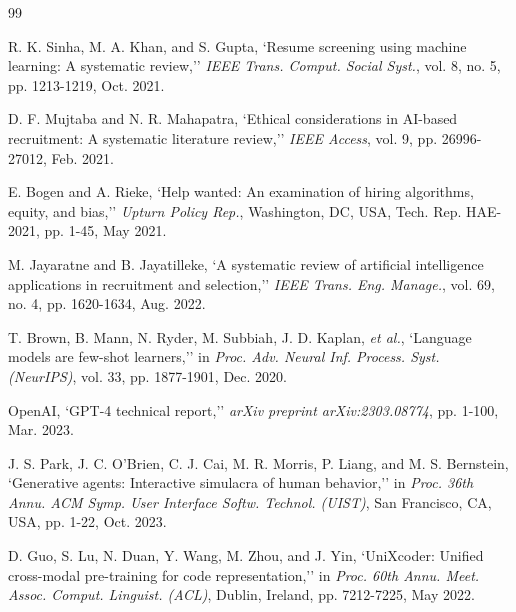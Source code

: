 \documentclass[12pt,a4paper]{report}
\begin{document}
\cleardoublepage
{}







\renewcommand{\bibname}{References and Bibliography}
\begin{thebibliography}{99}


R. K. Sinha, M. A. Khan, and S. Gupta, `Resume screening using machine learning: A systematic review,'' \textit{IEEE Trans. Comput. Social Syst.}, vol. 8, no. 5, pp. 1213-1219, Oct. 2021.

D. F. Mujtaba and N. R. Mahapatra, `Ethical considerations in AI-based recruitment: A systematic literature review,'' \textit{IEEE Access}, vol. 9, pp. 26996-27012, Feb. 2021.

E. Bogen and A. Rieke, `Help wanted: An examination of hiring algorithms, equity, and bias,'' \textit{Upturn Policy Rep.}, Washington, DC, USA, Tech. Rep. HAE-2021, pp. 1-45, May 2021.

M. Jayaratne and B. Jayatilleke, `A systematic review of artificial intelligence applications in recruitment and selection,'' \textit{IEEE Trans. Eng. Manage.}, vol. 69, no. 4, pp. 1620-1634, Aug. 2022.

T. Brown, B. Mann, N. Ryder, M. Subbiah, J. D. Kaplan, \textit{et al.}, `Language models are few-shot learners,'' in \textit{Proc. Adv. Neural Inf. Process. Syst. (NeurIPS)}, vol. 33, pp. 1877-1901, Dec. 2020.

OpenAI, `GPT-4 technical report,'' \textit{arXiv preprint arXiv:2303.08774}, pp. 1-100, Mar. 2023.

J. S. Park, J. C. O'Brien, C. J. Cai, M. R. Morris, P. Liang, and M. S. Bernstein, `Generative agents: Interactive simulacra of human behavior,'' in \textit{Proc. 36th Annu. ACM Symp. User Interface Softw. Technol. (UIST)}, San Francisco, CA, USA, pp. 1-22, Oct. 2023.

D. Guo, S. Lu, N. Duan, Y. Wang, M. Zhou, and J. Yin, `UniXcoder: Unified cross-modal pre-training for code representation,'' in \textit{Proc. 60th Annu. Meet. Assoc. Comput. Linguist. (ACL)}, Dublin, Ireland, pp. 7212-7225, May 2022.


\end{thebibliography}
\end{document}
